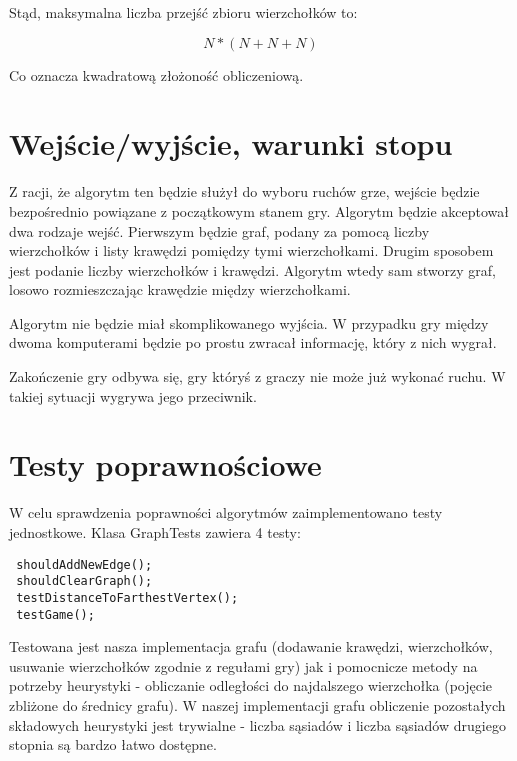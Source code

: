 \documentclass[11pt,a4paper]{article}
\begin{document}
Stąd, maksymalna liczba przejść zbioru wierzchołków to:

$$N*(N + N + N)$$

Co oznacza kwadratową złożoność obliczeniową. 

\section{Wejście/wyjście, warunki stopu}
Z racji, że algorytm ten będzie służył do wyboru ruchów grze, wejście będzie bezpośrednio powiązane z początkowym stanem gry. Algorytm będzie akceptował dwa rodzaje wejść. Pierwszym będzie graf, podany za pomocą liczby wierzchołków i listy krawędzi pomiędzy tymi wierzchołkami. Drugim sposobem jest podanie liczby wierzchołków i krawędzi. Algorytm wtedy sam stworzy graf, losowo rozmieszczając krawędzie między wierzchołkami. 

Algorytm nie będzie miał skomplikowanego wyjścia. W przypadku gry między dwoma komputerami będzie po prostu zwracał informację, który z nich wygrał. 

Zakończenie gry odbywa się, gry któryś z graczy nie może już wykonać ruchu. W takiej sytuacji wygrywa jego przeciwnik.

\section{Testy poprawnościowe}
W celu sprawdzenia poprawności algorytmów zaimplementowano testy jednostkowe. Klasa
GraphTests zawiera 4 testy: 
\begin{lstlisting}
 shouldAddNewEdge();
 shouldClearGraph();
 testDistanceToFarthestVertex();
 testGame();
\end{lstlisting}
Testowana jest nasza implementacja grafu (dodawanie krawędzi, wierzchołków, usuwanie wierzchołków zgodnie z regułami gry) jak i pomocnicze metody na potrzeby heurystyki - obliczanie odległości do najdalszego wierzchołka (pojęcie zbliżone do średnicy grafu). W naszej implementacji grafu obliczenie pozostałych składowych heurystyki jest trywialne - liczba sąsiadów i liczba sąsiadów drugiego stopnia są bardzo łatwo dostępne.
\end{document}

